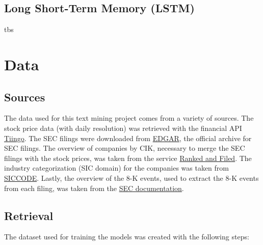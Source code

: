 \documentclass{article}
\begin{document}
	\subsection{Long Short-Term Memory (LSTM)}
	
	tbs
	
	\section{Data}
	
	\subsection{Sources}
	
	The data used for this text mining project comes from a variety of sources. The stock price data (with daily resolution) was retrieved with the financial API \href{https://www.tiingo.com}{Tiingo}. The SEC filings were downloaded from \href{https://www.sec.gov/Archives/edgar/full-index/}{EDGAR}, the official archive for SEC filings. The overview of companies by CIK, necessary to merge the SEC filings with the stock prices, was taken from the service \href{http://rankandfiled.com/#/data/tickers}{Ranked and Filed}. The industry categorization (SIC domain) for the companies was taken from \href{https://siccode.com}{SICCODE}. Lastly, the overview of the 8-K events, used to extract the 8-K events from each filing, was taken from the  \href{https://www.sec.gov/fast-answers/answersform8khtm.html}{SEC documentation}. 
	
	\subsection{Retrieval}
	
	The dataset used for training the models was created with the following steps: 
	
\end{document}
